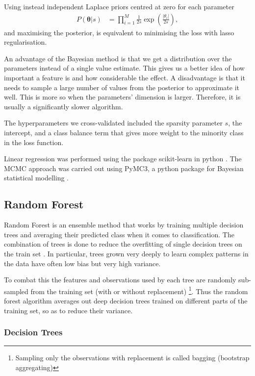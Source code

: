   
  Using instead independent Laplace priors centred at zero for each parameter
  \begin{align}
  		P(\bm{\theta}|s) &= \prod_{i = 1}^{M} \frac{1}{2s} \exp\left(\frac{|\theta_i|}{2s}\right),
  \end{align} 
  and maximising the posterior, is equivalent to minimising the loss with lasso regularisation.
  
  An advantage of the Bayesian method is that we get a distribution over the parameters instead of a single value estimate. This gives us a better idea of how important a feature is and how considerable the effect. A disadvantage is that it needs to sample a large number of values from the posterior to approximate it well. This is more so when the parameters' dimension is larger. Therefore, it is usually a significantly slower algorithm.
  
  The hyperparameters we cross-validated included the sparsity parameter $s$, the intercept, and a class balance term that gives more weight to the minority class in the loss function. 
  
  Linear regression was performed using the package scikit-learn in python \cite{scikit-learn}. The MCMC approach was carried out using PyMC3, a python package for Bayesian statistical modelling \cite{Salvatier2016}.
  
  
\subsection{Random Forest}
Random Forest is an ensemble method that works by training multiple decision trees and averaging their predicted class when it comes to classification. The combination of trees is done to reduce the overfitting of single decision trees on the train set \cite{hastie_elements_2009}. In particular, trees grown very deeply to learn complex patterns in the data have often low bias but very high variance. 

To combat this the features and observations used by each tree are randomly sub-sampled from the training set (with or without replacement) \footnote{Sampling only the observations with replacement is called bagging (bootstrap aggregating)}. Thus the random forest algorithm averages out deep decision trees trained on different parts of the training set, so as to reduce their variance.  

 \subsubsection{Decision Trees}

